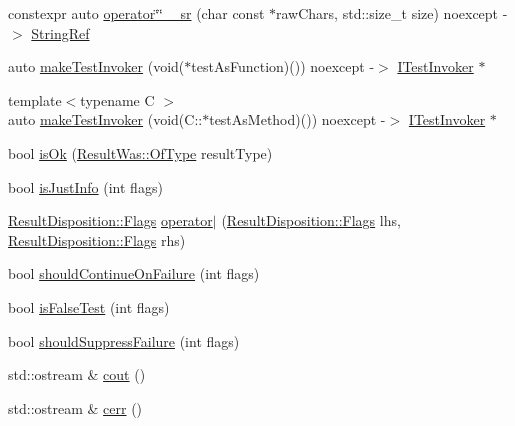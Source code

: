 \begin{DoxyCompactItemize}
\item 
constexpr auto \mbox{\hyperlink{namespace_catch_a47df617ba5e55ebe3394bdf6c0668b5a}{operator\char`\"{}\char`\"{} \+\_\+sr}} (char const $\ast$raw\+Chars, std\+::size\+\_\+t size) noexcept -\/$>$ \mbox{\hyperlink{class_catch_1_1_string_ref}{String\+Ref}}
\item 
auto \mbox{\hyperlink{namespace_catch_ab3d8ccbc900fe50322c39ecbba52f536}{make\+Test\+Invoker}} (void($\ast$test\+As\+Function)()) noexcept -\/$>$ \mbox{\hyperlink{struct_catch_1_1_i_test_invoker}{I\+Test\+Invoker}} $\ast$
\item 
{\footnotesize template$<$typename C $>$ }\\auto \mbox{\hyperlink{namespace_catch_a82a954c4d70afa716115820dc7dc8d24}{make\+Test\+Invoker}} (void(C\+::$\ast$test\+As\+Method)()) noexcept -\/$>$ \mbox{\hyperlink{struct_catch_1_1_i_test_invoker}{I\+Test\+Invoker}} $\ast$
\item 
bool \mbox{\hyperlink{namespace_catch_a5205869c81c06d3460759cb86676ae68}{is\+Ok}} (\mbox{\hyperlink{struct_catch_1_1_result_was_a624e1ee3661fcf6094ceef1f654601ef}{Result\+Was\+::\+Of\+Type}} result\+Type)
\item 
bool \mbox{\hyperlink{namespace_catch_a54b01af61673a3e1f21f31713639b180}{is\+Just\+Info}} (int flags)
\item 
\mbox{\hyperlink{struct_catch_1_1_result_disposition_a3396cad6e2259af326b3aae93e23e9d8}{Result\+Disposition\+::\+Flags}} \mbox{\hyperlink{namespace_catch_ab32a083e442cc09f736327d2e2865999}{operator$\vert$}} (\mbox{\hyperlink{struct_catch_1_1_result_disposition_a3396cad6e2259af326b3aae93e23e9d8}{Result\+Disposition\+::\+Flags}} lhs, \mbox{\hyperlink{struct_catch_1_1_result_disposition_a3396cad6e2259af326b3aae93e23e9d8}{Result\+Disposition\+::\+Flags}} rhs)
\item 
bool \mbox{\hyperlink{namespace_catch_a7f7480b15d74965459c844f0d393ed87}{should\+Continue\+On\+Failure}} (int flags)
\item 
bool \mbox{\hyperlink{namespace_catch_a93ef4e3e307a2021ca0d41b32c0e54b0}{is\+False\+Test}} (int flags)
\item 
bool \mbox{\hyperlink{namespace_catch_ab91eb13081203d634fe48d3d2ab386d7}{should\+Suppress\+Failure}} (int flags)
\item 
std\+::ostream \& \mbox{\hyperlink{namespace_catch_a50af73c5a37ad5c6558df4ce4a275e83}{cout}} ()
\item 
std\+::ostream \& \mbox{\hyperlink{namespace_catch_a4e5b5dc07abdfa30de33593dfab71f43}{cerr}} ()
\item 

\end{DoxyCompactItemize}
